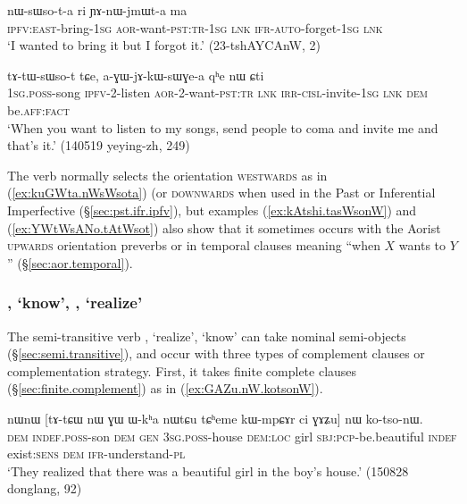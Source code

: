 \begin{exe}
\ex \label{ex:kuGWta.nWsWsota}
\gll [ku-ɣɯt-a] nɯ-sɯso-t-a ri ɲɤ-nɯ-jmɯt-a ma \\
\textsc{ipfv}:\textsc{east}-bring-\textsc{1sg} \textsc{aor}-want-\textsc{pst}:\textsc{tr}-\textsc{1sg} \textsc{lnk} \textsc{ifr}-\textsc{auto}-forget-\textsc{1sg} \textsc{lnk} \\
\glt `I wanted to bring it but I forgot it.' (23-tshAYCAnW, 2)
\end{exe}
 
\begin{exe}
\ex \label{ex:YWtWsANo.tAtWsot}
 tɤ-tɯ-sɯso-t tɕe, a-ɣɯ-jɤ-kɯ-sɯɣe-a qʰe nɯ ɕti \\
\textsc{1sg}.\textsc{poss}-song \textsc{ipfv}-2-listen \textsc{aor}-2-want-\textsc{pst}:\textsc{tr} \textsc{lnk} \textsc{irr}-\textsc{cisl}-invite-\textsc{1sg} \textsc{lnk} \textsc{dem} be.\textsc{aff}:\textsc{fact} \\
\glt   `When you want to listen to my songs, send people to coma and invite me and that's it.' (140519 yeying-zh, 249)
\end{exe}

The verb  normally selects the orientation \textsc{westwards} as in (\ref{ex:kuGWta.nWsWsota}) (or \textsc{downwards} when used in the Past or Inferential Imperfective (§\ref{sec:pst.ifr.ipfv}), but examples (\ref{ex:kAtshi.tasWsonW}) and (\ref{ex:YWtWsANo.tAtWsot}) also show that it sometimes occurs with the Aorist \textsc{upwards} orientation preverbs  or  in temporal clauses meaning ``when $X$ wants to $Y$'' (§\ref{sec:aor.temporal}).
  
\subsubsection{, `know', , `realize'} \label{sec:tso.sWXsAl}
The semi-transitive verb , `realize',  `know' can take nominal semi-objects (§\ref{sec:semi.transitive}), and occur with three types of complement clauses or complementation strategy. First, it takes finite complete clauses (§\ref{sec:finite.complement}) as in (\ref{ex:GAZu.nW.kotsonW}).

\begin{exe}
\ex \label{ex:GAZu.nW.kotsonW}
\gll  nɯnɯ [tɤ-tɕɯ nɯ ɣɯ ɯ-kʰa nɯtɕu tɕʰeme kɯ-mpɕɤr ci ɣɤʑu] nɯ ko-tso-nɯ. \\
\textsc{dem} \textsc{indef}.\textsc{poss}-son \textsc{dem} \textsc{gen} \textsc{3sg}.\textsc{poss}-house \textsc{dem}:\textsc{loc} girl \textsc{sbj}:\textsc{pcp}-be.beautiful \textsc{indef} exist:\textsc{sens} \textsc{dem} \textsc{ifr}-understand-\textsc{pl} \\
\glt `They realized that there was a beautiful girl in the boy's house.' (150828 donglang, 92)
\end{exe}

